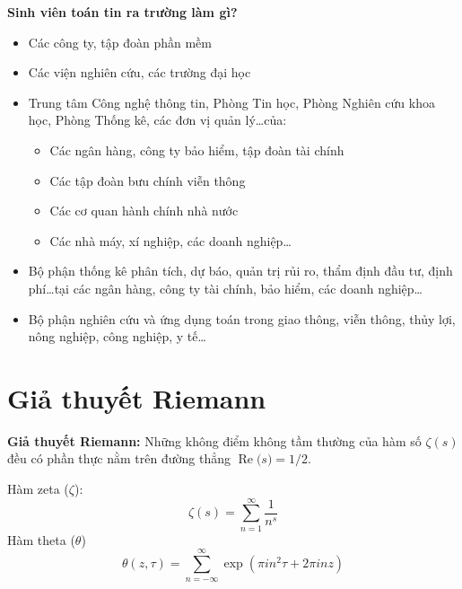 \documentclass[14pt]{extarticle}
\newcommand{\real}[1]{\operatorname{Re}{#1}}
\begin{document}
\textbf{Sinh viên toán tin ra trường làm gì?}
\begin{itemize}
	\item Các công ty, tập đoàn phần mềm
	\item Các viện nghiên cứu, các trường đại học
	\item Trung tâm Công nghệ thông tin, Phòng Tin học, Phòng Nghiên cứu khoa học, Phòng Thống kê, các đơn vị quản lý\ldots của:
		\begin{itemize}
			\item Các ngân hàng, công ty bảo hiểm, tập đoàn tài chính
			\item Các tập đoàn bưu chính viễn thông
			\item Các cơ quan hành chính nhà nước
			\item Các nhà máy, xí nghiệp, các doanh nghiệp\ldots
		\end{itemize}
	\item Bộ phận thống kê phân tích, dự báo, quản trị rủi ro, thẩm định đầu tư, định phí\ldots tại các ngân hàng, công ty tài chính, bảo hiểm, các doanh nghiệp\ldots
	\item Bộ phận nghiên cứu và ứng dụng toán trong giao thông, viễn thông, thủy lợi, nông nghiệp, công nghiệp, y tế\ldots
\end{itemize}

\section{Giả thuyết Riemann}

\textbf{Giả thuyết Riemann: }Những không điểm không tầm thường của hàm số $\zeta(s)$ đều có phần thực nằm trên đường thẳng $\real(s) = 1/2$.\par
Hàm zeta ($\zeta$):
\begin{equation*}
	\zeta(s) = \sum_{n=1}^\infty \frac 1 {n^s}
\end{equation*}
Hàm theta ($\theta$)
\begin{equation*}
	\theta(z,\tau) = \sum_{n=-\infty}^\infty \exp(\pi i n^2 \tau + 2\pi i n z)
\end{equation*}
\end{document}
